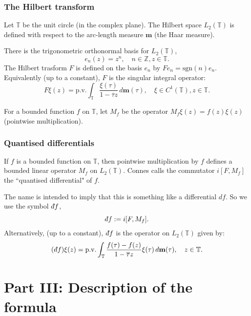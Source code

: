 \documentclass{beamer} %
\theoremstyle{definition} %
\newcommand{\Itgr}{\mathbb{Z}}
\newcommand{\Circ}{\mathbb{T}}
\newcommand{\sgn}{\mathrm{sgn}}
\def\qd{\,{\mathchar'26\mkern-12mu d}}
\begin{document}
\begin{frame}\frametitle{The Hilbert transform}
    Let $\Circ$ be the unit circle (in the complex plane). The Hilbert space $L_2(\Circ)$ is
    defined with respect to the arc-length measure $\mathbf{m}$ (the Haar measure).
    
    There is the trigonometric orthonormal basis for $L_2(\Circ)$,
    \begin{equation*}
        e_n(z) = z^n,\quad n\in \Itgr, z \in \Circ.
    \end{equation*}
    The Hilbert trasform $F$ is defined on the basis $e_n$ by $Fe_n = \sgn(n)e_n$.
    Equivalently (up to a constant), $F$ is the singular integral operator:
    \begin{equation*}
        F\xi(z) = \mathrm{p.v.}\int_{\Circ} \frac{\xi(\tau)}{1-\overline{\tau}z}\,d\mathbf{m}(\tau),\quad \xi \in C^1(\Circ), z \in \Circ.
    \end{equation*}
    
    For a bounded function $f$ on $\Circ$, let $M_f$ be the operator $M_f\xi(z) = f(z)\xi(z)$ (pointwise multiplication).
\end{frame}


\begin{frame}\frametitle{Quantised differentials}
    If $f$ is a bounded function on $\Circ$, then pointwise multiplication
    by $f$ defines a bounded linear operator $M_f$ on $L_2(\Circ)$. 
    Connes calls the commutator $i[F,M_f]$ the ``quantised differential" of $f$.
    
    The name is intended to imply that this is something like a differential $df$. So we use the symbol $\qd f$,
    \begin{equation*}
        \qd f := i[F,M_f].
    \end{equation*}
    Alternatively, (up to a constant), $\qd f$ is the operator on $L_2(\Circ)$ given by:
    \begin{equation*}
        (\qd f)\xi(z) = \mathrm{p.v.}\int_{\Circ} \frac{f(\tau)-f(z)}{1-\overline{\tau}z}\xi(\tau)\,d\mathbf{m}(\tau),\quad z \in \Circ.
    \end{equation*}
\end{frame}


\section{Part III: Description of the formula}
\end{document}
